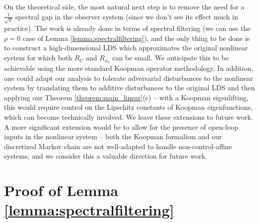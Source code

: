\documentclass[11pt]{article}
\numberwithin{equation}{section}
\begin{document}
On the theoretical side, the most natural next step is to remove the need for a $\frac{1}{\sqrt{T}}$ spectral gap in the observer system (since we don't see its effect much in practice). The work is already done in terms of spectral filtering (we can use the $\rho = 0$ case of Lemma \ref{lemma:spectralfiltering}), and the only thing to be done is to construct a high-dimensional LDS which approximates the original nonlinear system for which both $R_C$ and $R_{x_0}$ can be small. We anticipate this to be achievable using the more standard Koopman operator methodology. In addition, one could adapt our analysis to tolerate adversarial disturbances to the nonlinear system by translating them to additive disturbances to the original LDS and then applying our Theorem \ref{theorem:main_linear}(c) -- with a Koopman eigenlifting, this would require control on the Lipschitz constants of Koopman eigenfunctions, which can become technically involved. We leave these extensions to future work. A more significant extension would be to allow for the presence of open-loop inputs in the nonlinear system -- both the Koopman formalism and our discretized Markov chain are not well-adapted to handle non-control-affine systems, and we consider this a valuable direction for future work.
% 




\appendix
\section{Proof of Lemma \ref{lemma:spectralfiltering}}   \label{appendix:SFlemma}
\end{document}
